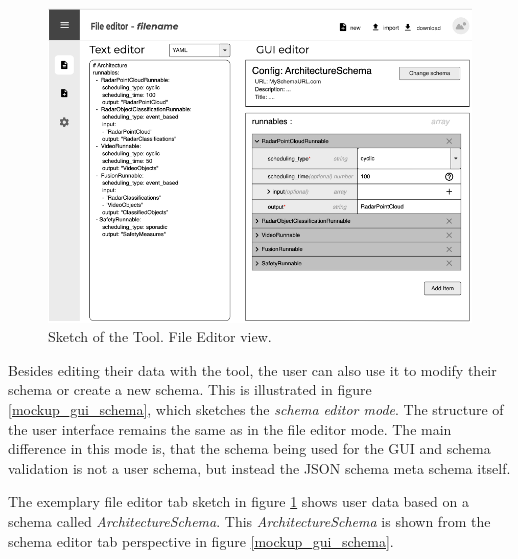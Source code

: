 \begin{figure}[!t]
    \includegraphics[width=\textwidth]{figures/mockup_gui_config}
    \caption{Sketch of the Tool. File Editor view.}
    \label{mockup_gui_config}
\end{figure}



Besides editing their data with the tool, the user can also use it to modify their schema or create a new schema.
This is illustrated in figure \ref{mockup_gui_schema}, which sketches the \textit{schema editor mode}.
The structure of the user interface remains the same as in the file editor mode.
The main difference in this mode is, that the schema being used for the GUI and schema validation is not a user schema, but instead the JSON schema meta schema itself.

The exemplary file editor tab sketch in figure \ref{mockup_gui_config} shows user data based on a schema called \textit{ArchitectureSchema}.
This \textit{ArchitectureSchema} is shown from the schema editor tab perspective in figure \ref{mockup_gui_schema}.


